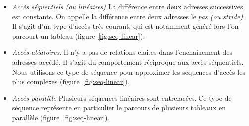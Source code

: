 \begin{itemize}
	\item \emph{Accès séquentiels (ou linéaires)} La différence entre deux adresses successives est constante.
	On appelle la différence entre deux adresses le \emph{pas (ou stride)}.
	Il s'agit d'un type d'accès très courant, qui est notamment généré lors l'on parcourt un tableau (figure~\ref{fig:seq-linear}).

	\item \emph{Accès aléatoires}. Il n'y a pas de relations claires dans l'enchaînement des adresses accédé.
	Il s'agit du comportement réciproque aux accès séquentiels.
	Nous utilisons ce type de séquence pour approximer les séquences d'accès les plus complexes (figure~\ref{fig:seq-linear}).
		
	\item \emph{Accès parallèle} Plusieurs séquences linéaires sont entrelacées.
	Ce type de séquence représente en particulier le parcours de plusieurs tableaux en parallèle (figure~\ref{fig:seq-linear}).
\end{itemize}

